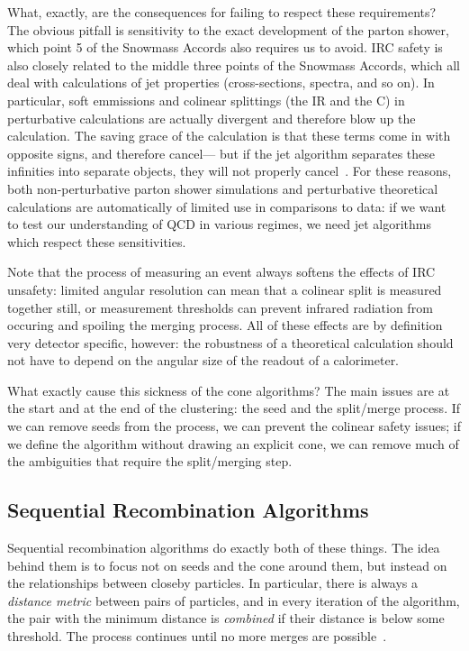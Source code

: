 What, exactly, are the consequences for failing to respect these requirements? The obvious pitfall is sensitivity to the exact development of the parton shower, which point 5 of the Snowmass Accords also requires us to avoid. IRC safety is also closely related to the middle three points of the Snowmass Accords, which all deal with calculations of jet properties (cross-sections, \pt spectra, and so on). In particular, soft emmissions and colinear splittings (the IR and the C) in perturbative calculations are actually divergent and therefore blow up the calculation. The saving grace of the calculation is that these terms come in with opposite signs, and therefore cancel--- but if the jet algorithm separates these infinities into separate objects, they will not properly cancel~\cite{Jetography}. For these reasons, both non-perturbative parton shower simulations and perturbative theoretical calculations are automatically of limited use in comparisons to data: if we want to test our understanding of QCD in various regimes, we need jet algorithms which respect these sensitivities.

Note that the process of measuring an event always softens the effects of IRC unsafety: limited angular resolution can mean that a colinear split is measured together still, or measurement thresholds can prevent infrared radiation from occuring and spoiling the merging process. All of these effects are by definition very detector specific, however: the robustness of a theoretical calculation should not have to depend on the angular size of the readout of a calorimeter.

What exactly cause this sickness of the cone algorithms? The main issues are at the start and at the end of the clustering: the seed and the split/merge process. If we can remove seeds from the process, we can prevent the colinear safety issues; if we define the algorithm without drawing an explicit cone, we can remove much of the ambiguities that require the split/merging step.

\subsection{Sequential Recombination Algorithms}
\label{chapter:jets-and-substructure:sequential}


Sequential recombination algorithms do exactly both of these things. The idea behind them is to focus not on seeds and the cone around them, but instead on the relationships between closeby particles. In particular, there is always a \textit{distance metric} between pairs of particles, and in every iteration of the algorithm, the pair with the minimum distance is \textit{combined} if their distance is below some threshold. The process continues until no more merges are possible~\cite{Jetography}.

